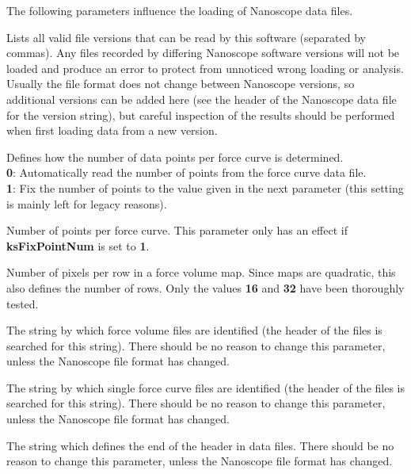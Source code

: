 \documentclass[12pt,a4paper]{article}
\begin{document}
The following parameters influence the loading of Nanoscope data files.
\begin{description}[style=nextline]

\item[ksVersionReq]
Lists all valid file versions that can be read by this software (separated by commas). Any files recorded by differing Nanoscope software versions will not be loaded and produce an error to protect from unnoticed wrong loading or analysis. Usually the file format does not change between Nanoscope versions, so additional versions can be added here (see the header of the Nanoscope data file for the version string), but careful inspection of the results should be performed when first loading data from a new version.

\item[ksFixPointNum]
Defines how the number of data points per force curve is determined.\\
\textbf{0}: Automatically read the number of points from the force curve data file.\\
\textbf{1}: Fix the number of points to the value given in the next parameter (this setting is mainly left for legacy reasons).

\item[ksFCPoints]
Number of points per force curve. This parameter only has an effect if \textbf{ksFixPointNum} is set to \textbf{1}.

\item[ksFVRowSize]
Number of pixels per row in a force volume map. Since maps are quadratic, this also defines the number of rows. Only the values \textbf{16} and \textbf{32} have been thoroughly tested.

\item[ksFileTypeFV]
The string by which force volume files are identified (the header of the files is searched for this string). There should be no reason to change this parameter, unless the Nanoscope file format has changed.

\item[ksFileTypeFC]
The string by which single force curve files are identified (the header of the files is searched for this string). There should be no reason to change this parameter, unless the Nanoscope file format has changed.

\item[ksHeaderEnd]
The string which defines the end of the header in data files. There should be no reason to change this parameter, unless the Nanoscope file format has changed.

\end{description}
\end{document}
